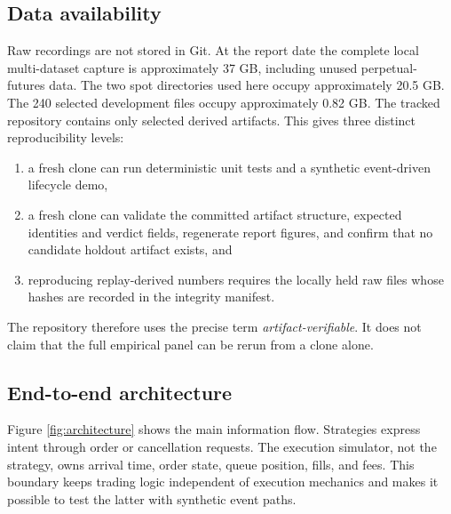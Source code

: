 \subsection{Data availability}

Raw recordings are not stored in Git. At the report date the complete local
multi-dataset capture is approximately 37 GB, including unused
perpetual-futures data. The two spot directories used here occupy approximately
20.5 GB. The 240 selected development files occupy approximately 0.82 GB. The
tracked repository contains only selected derived artifacts. This gives three
distinct reproducibility levels:

\begin{enumerate}
  \item a fresh clone can run deterministic unit tests and a synthetic
        event-driven lifecycle demo,
  \item a fresh clone can validate the committed artifact structure, expected
        identities and verdict fields, regenerate report figures, and confirm
        that no candidate holdout artifact exists, and
  \item reproducing replay-derived numbers requires the locally held raw files
        whose hashes are recorded in the integrity manifest.
\end{enumerate}

The repository therefore uses the precise term \emph{artifact-verifiable}. It
does not claim that the full empirical panel can be rerun from a clone alone.

\subsection{End-to-end architecture}

Figure \ref{fig:architecture} shows the main information flow. Strategies
express intent through order or cancellation requests. The execution simulator,
not the strategy, owns arrival time, order state, queue position, fills, and
fees. This boundary keeps trading logic independent of execution mechanics and
makes it possible to test the latter with synthetic event paths.

